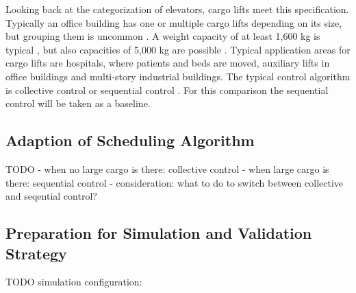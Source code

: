 Looking back at the categorization of elevators, cargo lifts meet this specification.
Typically an office building has one or multiple cargo lifts depending on its size,
but grouping them is uncommon \autocite[][p.~167]{barney2016handbook}.
A weight capacity of at least 1,600 kg is typical \autocite[][p.~167]{barney2016handbook},
but also capacities of 5,000 kg are possible \autocite[][]{kone2017overview}.
Typical application areas for cargo lifts are hospitals, where patients and beds are moved,
auxiliary lifts in office buildings and multi-story industrial buildings.
The typical control algorithm is collective control or sequential control \autocite[][pp.~238,~244]{barney2016handbook}.
For this comparison the sequential control will be taken as a baseline.

\subsection{Adaption of Scheduling Algorithm}
TODO
- when no large cargo is there: collective control
- when large cargo is there: sequential control
- consideration: what to do to switch between collective and seqential control?
\subsection{Preparation for Simulation and Validation Strategy}

TODO simulation configuration:
\autocite[][p.~347]{barney2016handbook}

